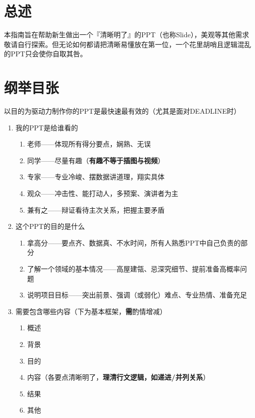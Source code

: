 \section[总述]{总述}
本指南旨在帮助新生做出一个『清晰明了』的PPT（也称Slide），美观等其他需求敬请自行探索。但无论如何都请把清晰易懂放在第一位，一个花里胡哨且逻辑混乱的PPT只会使你自取其咎。

\section[纲举目张]{纲举目张}
以目的为驱动力制作你的PPT是最快速最有效的（尤其是面对DEADLINE时）
\begin{enumerate}
    \item 我的PPT是给谁看的
          \begin{enumerate}
              \item 老师——体现所有得分要点，娴熟、无误
              \item 同学——尽量有趣（\textbf{有趣不等于插图与视频}）
              \item 专家——专业冷峻、摆数据讲道理，翔实具体
              \item 观众——冲击性、能打动人，多预案、演讲者为主
              \item 兼有之——辩证看待主次关系，把握主要矛盾
          \end{enumerate}
    \item 这个PPT的目的是什么
          \begin{enumerate}
              \item 拿高分——要点齐、数据真、不水时间，所有人熟悉PPT中自己负责的部分
              \item 了解一个领域的基本情况——高屋建瓴、忌深究细节、提前准备高概率问题
              \item 说明项目目标——突出前景、强调（或弱化）难点、专业热情、准备充足
          \end{enumerate}
    \item 需要包含哪些内容（下为基本框架，\textbf{需}酌情增减）
          \begin{enumerate}
              \item 概述
              \item 背景
              \item 目的
              \item 内容（各要点清晰明了，\textbf{理清行文逻辑，如递进/并列关系}）
              \item 结果
              \item 其他

\end{enumerate}
\end{enumerate}
